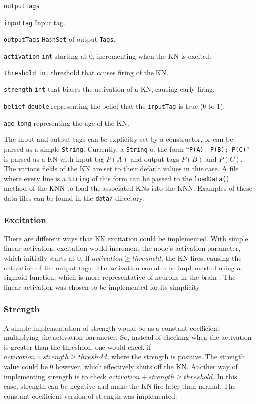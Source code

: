 \documentclass[titlepage,11pt]{article}
\newcommand{\code}[1]{\texttt{#1}}
\begin{document}
\begin{labeling}{\code{outputTags}}
	\item[\code{inputTag}] Input tag.
	\item[\code{outputTags}] \code{HashSet} of output \code{Tags}.
	\item[\code{activation}] \code{int} starting at 0, incrementing when the KN is excited.
	\item[\code{threshold}] \code{int} threshold that causes firing of the KN.
	\item[\code{strength}] \code{int} that biases the activation of a KN, causing early firing.
	\item[\code{belief}] \code{double} representing the belief that the \code{inputTag} is true (0 to 1).
	\item[\code{age}] \code{long} representing the age of the KN.
\end{labeling}

The input and output tags can be explicitly set by a constructor, or can be parsed as a simple \code{String}. Currently, a \code{String} of the form ``\code{P(A); P(B); P(C)}'' is parsed as a KN with input tag $P(A)$ and output tags $P(B)$ and $P(C)$. The various fields of the KN are set to their default values in this case. A file where every line is a \code{String} of this form can be passed to the \code{loadData()} method of the KNN to load the associated KNs into the KNN. Examples of these data files can be found in the \code{data/} directory.

\subsubsection{Excitation}

There are different ways that KN excitation could be implemented. With simple linear activation, excitation would increment the node's activation parameter, which initially starts at 0. If $activation \geq threshold$, the KN fires, causing the activation of the output tags. The activation can also be implemented using a sigmoid function, which is more representative of neurons in the brain \cite{neuro}. The linear activation was chosen to be implemented for its simplicity.

\subsubsection{Strength}

A simple implementation of strength would be as a constant coefficient multiplying the activation parameter. So, instead of checking when the activation is greater than the threshold, one would check if $activation \times strength \geq threshold$, where the strength is positive. The strength value could be 0 however, which effectively shuts off the KN. Another way of implementing strength is to check $activation + strength \geq threshold$. In this case, strength can be negative and make the KN fire later than normal. The constant coefficient version of strength was implemented.
\end{document}
